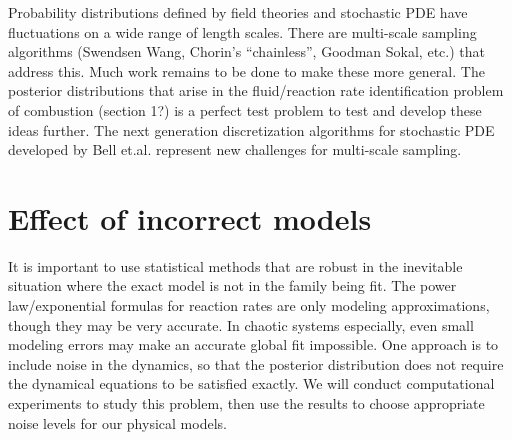 \documentclass[11pt]{article}
\begin{document}
Probability distributions defined by field theories and stochastic PDE have fluctuations on a wide
range of length scales.
There are multi-scale sampling algorithms (Swendsen Wang, Chorin's ``chainless'', Goodman Sokal, etc.)
that address this.
Much work remains to be done to make these more general.
The posterior distributions that arise in the fluid/reaction rate identification problem of combustion
(section 1?) is a perfect test problem to test and develop these ideas further.
The next generation discretization algorithms for stochastic PDE developed by Bell et.al. represent 
new challenges for multi-scale sampling.



\section{Effect of incorrect models}

It is important to use statistical methods that are robust in the inevitable situation where the
exact model is not in the family being fit.
The power law/exponential formulas for reaction rates are only modeling approximations, though they
may be very accurate.
In chaotic systems especially, even small modeling errors may make an accurate global fit impossible.
One approach is to include noise in the dynamics, so that the posterior distribution does not require
the dynamical equations to be satisfied exactly.
We will conduct computational experiments to study this problem, then use the results to 
choose appropriate noise levels for our physical models.
\end{document}
